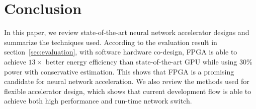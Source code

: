 \section{Conclusion}\label{sec:conclusion}

In this paper, we review state-of-the-art neural network accelerator designs and summarize the techniques used. According to the evaluation result in section~\ref{sec:evaluation}, with software hardware co-design, FPGA is able to achieve $13\times$ better energy efficiency than state-of-the-art GPU while using $30\%$ power with conservative estimation. This shows that FPGA is a promising candidate for neural network acceleration. We also review the methods used for flexible accelerator design, which shows that current development flow is able to achieve both high performance and run-time network switch.